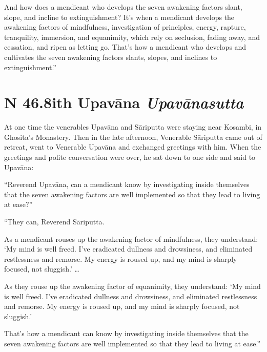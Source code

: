 \documentclass[12pt,openany]{book}%
\newcommand*{\suttatitleacronym}[1]{\smaller[2]{#1}\vspace*{.3em}}
\newcommand*{\suttatitletranslation}[1]{\linebreak{#1}}
\newcommand*{\suttatitleroot}[1]{\linebreak\smaller[2]\itshape{#1}}
\newcommand*{\tocacronym}[1]{\hspace*{-3.3em}{#1}\quad}
\newcommand*{\toctranslation}[1]{#1}
\newcommand*{\tocroot}[1]{(\textit{#1})}
\begin{document}
And how does a mendicant who develops the seven awakening factors slant, slope, and incline to extinguishment? It’s when a mendicant develops the awakening factors of mindfulness, investigation of principles, energy, rapture, tranquility, immersion, and equanimity, which rely on seclusion, fading away, and cessation, and ripen as letting go. That’s how a mendicant who develops and cultivates the seven awakening factors slants, slopes, and inclines to extinguishment.” 

%
\section*{{\suttatitleacronym SN 46.8}{\suttatitletranslation With Upavāna }{\suttatitleroot Upavānasutta}}
\addcontentsline{toc}{section}{\tocacronym{SN 46.8} \toctranslation{With Upavāna } \tocroot{Upavānasutta}}

At one time the venerables \textsanskrit{Upavāna} and \textsanskrit{Sāriputta} were staying near Kosambi, in Ghosita’s Monastery. Then in the late afternoon, Venerable \textsanskrit{Sāriputta} came out of retreat, went to Venerable \textsanskrit{Upavāna} and exchanged greetings with him. When the greetings and polite conversation were over, he sat down to one side and said to \textsanskrit{Upavāna}: 

“Reverend \textsanskrit{Upavāna}, can a mendicant know by investigating inside themselves that the seven awakening factors are well implemented so that they lead to living at ease?” 

“They can, Reverend \textsanskrit{Sāriputta}. 

As a mendicant rouses up the awakening factor of mindfulness, they understand: ‘My mind is well freed. I’ve eradicated dullness and drowsiness, and eliminated restlessness and remorse. My energy is roused up, and my mind is sharply focused, not sluggish.’ … 

As they rouse up the awakening factor of equanimity, they understand: ‘My mind is well freed. I’ve eradicated dullness and drowsiness, and eliminated restlessness and remorse. My energy is roused up, and my mind is sharply focused, not sluggish.’ 

That’s how a mendicant can know by investigating inside themselves that the seven awakening factors are well implemented so that they lead to living at ease.” 
\end{document}
